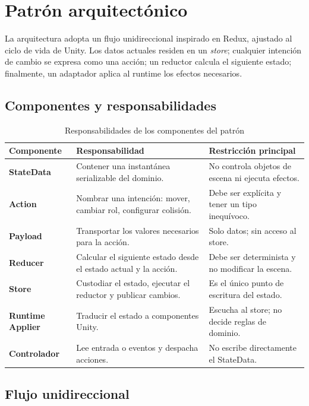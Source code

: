 \section{Patrón arquitectónico}

La arquitectura adopta un flujo unidireccional inspirado en Redux, ajustado al ciclo de vida de Unity. Los datos actuales residen en un \emph{store}; cualquier intención de cambio se expresa como una acción; un reductor calcula el siguiente estado; finalmente, un adaptador aplica al runtime los efectos necesarios.

\subsection{Componentes y responsabilidades}

\begin{table}[H]
\centering
\caption{Responsabilidades de los componentes del patrón}
\begin{tabularx}{\textwidth}{>{\bfseries}p{3.1cm}X X}
\toprule
Componente & Responsabilidad & Restricción principal \\
\midrule
StateData & Contener una instantánea serializable del dominio. & No controla objetos de escena ni ejecuta efectos. \\
Action & Nombrar una intención: mover, cambiar rol, configurar colisión. & Debe ser explícita y tener un tipo inequívoco. \\
Payload & Transportar los valores necesarios para la acción. & Solo datos; sin acceso al store. \\
Reducer & Calcular el siguiente estado desde el estado actual y la acción. & Debe ser determinista y no modificar la escena. \\
Store & Custodiar el estado, ejecutar el reductor y publicar cambios. & Es el único punto de escritura del estado. \\
Runtime Applier & Traducir el estado a componentes Unity. & Escucha al store; no decide reglas de dominio. \\
Controlador & Lee entrada o eventos y despacha acciones. & No escribe directamente el StateData. \\
\bottomrule
\end{tabularx}
\end{table}

\subsection{Flujo unidireccional}

